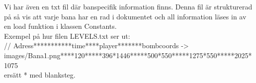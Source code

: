 \documentclass{TDP005mall}
\begin{document}
Vi har även en txt fil där banspecifik information finns. Denna fil är strukturerad på så vis
att varje bana har en rad i dokumentet och all information läses in av en load funktion i
klassen Constants.\\

Exempel på hur filen LEVELS.txt ser ut:\\
// Adress***********time****player*******bombcoords ->\\
images/Bana1.png****120*****396*1446*****500*550*****1275*550*****2025*1075\\
ersätt * med blanksteg.\\
\end{document}
